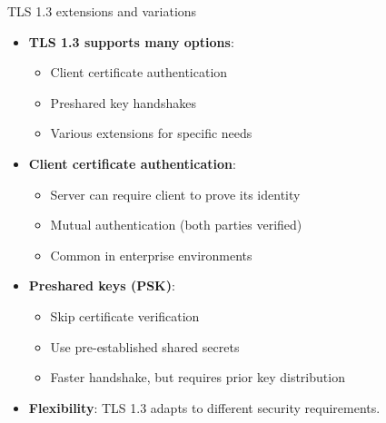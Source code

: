 \documentclass[aspectratio=169, lualatex, handout]{beamer}
\begin{document}
\begin{frame}{TLS 1.3 extensions and variations}
	\begin{itemize}[<+->]
		\item \textbf{TLS 1.3 supports many options}:
		      \begin{itemize}
			      \item Client certificate authentication
			      \item Preshared key handshakes
			      \item Various extensions for specific needs
		      \end{itemize}
		\item \textbf{Client certificate authentication}:
		      \begin{itemize}
			      \item Server can require client to prove its identity
			      \item Mutual authentication (both parties verified)
			      \item Common in enterprise environments
		      \end{itemize}
		\item \textbf{Preshared keys (PSK)}:
		      \begin{itemize}
			      \item Skip certificate verification
			      \item Use pre-established shared secrets
			      \item Faster handshake, but requires prior key distribution
		      \end{itemize}
		\item \textbf{Flexibility}: TLS 1.3 adapts to different security requirements.
	\end{itemize}
\end{frame}
\end{document}
